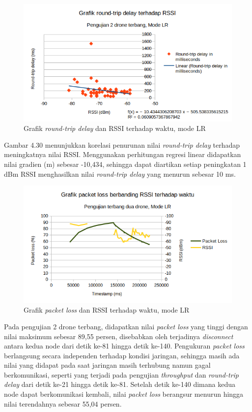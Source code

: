 \begin{figure}[H]
	\centering
	\includegraphics[scale=0.7]{./assets/Graphs/2Fly/Delay-RSSI}
	\caption{Grafik \textit{round-trip delay} dan RSSI terhadap waktu, mode LR}
\end{figure}
Gambar 4.30 menunjukkan korelasi penurunan nilai \textit{round-trip delay} terhadap meningkatnya nilai RSSI. Menggunakan perhitungan regresi linear didapatkan nilai gradien (m) sebesar -10,434, sehingga dapat diartikan setiap peningkatan 1 dBm RSSI menghasilkan nilai \textit{round-trip delay} yang menurun sebesar 10 ms.
\begin{figure}[H]
	\centering
	\includegraphics[scale=0.7]{./assets/Graphs/2Fly/PacketLoss-Time}
	\caption{Grafik \textit{packet loss} dan RSSI terhadap waktu, mode LR}
\end{figure}
Pada pengujian 2 drone terbang, didapatkan nilai \textit{packet loss} yang tinggi dengan nilai maksimum sebesar 89,55 persen, disebabkan oleh terjadinya \textit{disconnect} antara kedua node dari detik ke-81 hingga detik ke-140. Pengukuran \textit{packet loss} berlangsung secara independen terhadap kondisi jaringan, sehingga masih ada nilai yang didapat pada saat jaringan masih terhubung namun gagal berkomunikasi, seperti yang terjadi pada pengujian \textit{throughput} dan \textit{round-trip delay} dari detik ke-21 hingga detik ke-81. Setelah detik ke-140 dimana kedua node dapat berkomunikasi kembali, nilai \textit{packet loss} berangsur menurun hingga nilai terendahnya sebesar 55,04 persen.

